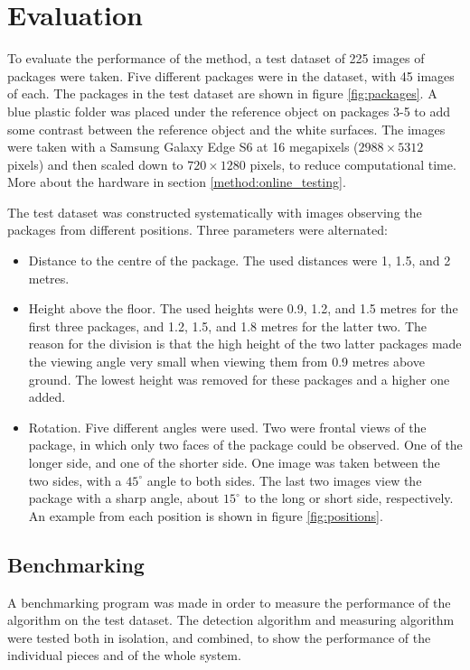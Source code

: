 \section{Evaluation}
To evaluate the performance of the method, a test dataset of 225 images of packages were taken.
Five different packages were in the dataset, with 45 images of each.
The packages in the test dataset are shown in figure \ref{fig:packages}. A blue plastic folder was placed under the reference object on packages 3-5 to add some contrast between the reference object and the white surfaces.
The images were taken with a Samsung Galaxy Edge S6 at 16 megapixels ($2988 \times 5312$ pixels) and then scaled down to $720 \times 1280$ pixels, to reduce computational time.
More about the hardware in section \ref{method:online_testing}.



The test dataset was constructed systematically with images observing the packages from different positions.
Three parameters were alternated: 
\begin{itemize}
	\item Distance to the centre of the package. 
			The used distances were 1, 1.5, and 2 metres.
	\item Height above the floor. 
			The used heights were 0.9, 1.2, and 1.5 metres for the first three packages, and 1.2, 1.5, and 1.8 metres for the latter two.
			The reason for the division is that the high height of the two latter packages made the viewing angle very small when viewing them from 0.9 metres above ground. The lowest height was removed for these packages and a higher one added.
	\item Rotation. 
			Five different angles were used.
			Two were frontal views of the package, in which only two faces of the package could be observed. One of the longer side, and one of the shorter side.
			One image was taken between the two sides, with a $45^\circ$ angle to both sides.
			The last two images view the package with a sharp angle, about $15^\circ$ to the long or short side, respectively.
			An example from each position is shown in figure \ref{fig:positions}.
\end{itemize}



\subsection{Benchmarking} \label{benchmarking}
A benchmarking program was made in order to measure the performance of the algorithm on the test dataset.
The detection algorithm and measuring algorithm were tested both in isolation, and combined, to show the performance of the individual pieces and of the whole system. 

